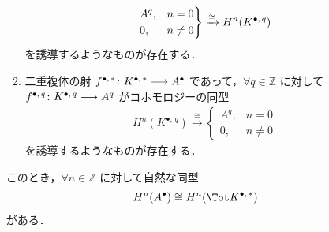 \documentclass[algtopo_main]{subfiles}
\begin{document}
\begin{mycol}[label=col:SS-double-complex, breakable]{}
\begin{enumerate}
\begin{enumerate}
            \begin{align}
                \begin{rcases}
                    A^q, & n=0 \\
                    0, & n\neq 0
                \end{rcases}
                \xrightarrow{\cong} H^n(K^{\bullet,\, q})
            \end{align}
            を誘導するようなものが存在する．
            \item 二重複体の射 $f^{\bullet,\, *} \colon K^{\bullet,\, *} \longrightarrow A^\bullet$ であって，$\forall q \in \mathbb{Z}$ に対して $f^{\bullet,\, q} \colon K^{\bullet,\, q} \longrightarrow A^q$ がコホモロジーの同型
            \begin{align}
                H^n(K^{\bullet,\, q}) \xrightarrow{\cong}
                \begin{cases}
                    A^q, & n=0 \\
                    0, & n\neq 0
                \end{cases}
            \end{align}
            を誘導するようなものが存在する．
        \end{enumerate}
        このとき，$\forall n \in \mathbb{Z}$ に対して自然な同型
        \begin{align}
            H^n(A^\bullet) \cong H^n (\Tot K^{\bullet,\, *})
        \end{align}
        がある．
    \end{enumerate}
    
\end{mycol}
\end{document}
